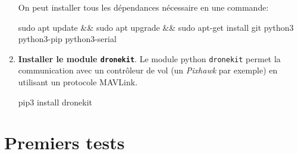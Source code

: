 \documentclass[a4paper, 10pt]{article}
\begin{document}
\begin{enumerate}
	On peut installer tous les dépendances nécessaire en une commande:
\begin{commandshell}
sudo apt update && sudo apt upgrade && sudo apt-get install git python3 python3-pip python3-serial
\end{commandshell}

	\item\textbf{Installer le module \texttt{dronekit}}. 
	Le module python \texttt{dronekit} permet la communication avec un
	contrôleur de vol (un \textit{Pixhawk} par exemple) en 
	utilisant un protocole MAVLink.
	
\begin{commandshell}
pip3 install dronekit
\end{commandshell}
\end{enumerate}

\section{Premiers tests}
\end{document}
